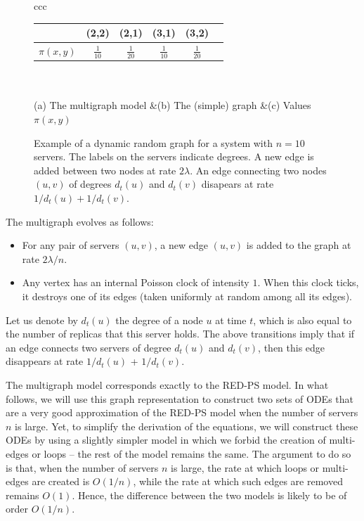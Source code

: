 \documentclass[acmsmall,nonacm]{acmart}
\begin{document}
\begin{figure}[ht]
\begin{tabular}{ccc}
\begin{minipage}{.35\linewidth}
\begin{tabular}{|c|c|c|c|c|c|}
            & (2,2) & (2,1) & (3,1) & (3,2)\\\hline
            $\pi(x,y)$ & $\frac1{10}$ & $\frac1{20}$ & $\frac{1}{10}$& $\frac{1}{20}$ \\
            \hline
        \end{tabular}
        \end{minipage}\\~\\
        (a) The multigraph model
        &(b) The (simple) graph
        &(c) Values $\pi(x,y)$
    \end{tabular}    
    \caption{Example of a dynamic random graph for a system with $n=10$ servers. The labels on the servers indicate degrees. A new edge is added between two nodes at rate $2\lambda$. An edge connecting two nodes $(u,v)$ of degrees $d_t(u)$ and $d_t(v)$ disapears at rate $1/d_t(u)+1/d_t(v)$.}
    \label{fig:dynamic_graph}
\end{figure}

The multigraph evolves as follows:
\begin{itemize}
    \item For any pair of servers $(u,v)$, a new edge $(u,v)$ is added to the graph at rate $2\lambda/n$. 
    \item Any vertex has an internal Poisson clock of intensity $1$. When this clock ticks, it destroys one of its edges (taken uniformly at random among all its edges).  
\end{itemize}
Let us denote by $d_t(u)$ the degree of a node $u$ at time $t$, which is also equal to the number of replicas that this server holds. The above transitions imply that if an edge connects two servers of degree $d_t(u)$ and $d_t(v)$, then this edge disappears at rate $1/d_t(u)$ + $1/d_t(v)$.

The multigraph model corresponds exactly to the RED-PS model. In what follows, we will use this graph representation to construct two sets of ODEs that are a very good approximation of the RED-PS model when the number of servers $n$ is large. Yet, to simplify the derivation of the equations, we will construct these ODEs by using a slightly simpler model in which we forbid the creation of multi-edges or loops -- the rest of the model remains the same.  The argument to do so is that, when the number of servers $n$ is large, the rate at which loops or multi-edges are created is $O(1/n)$, while the rate at which such edges are removed remains $O(1)$. Hence, the difference between the two models is likely to be of order $O(1/n)$.
\end{document}
